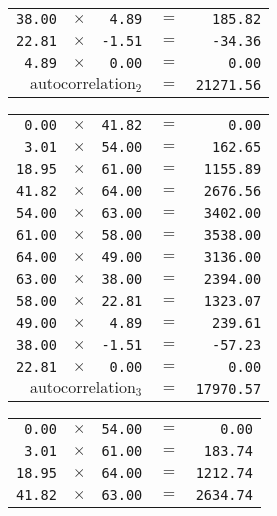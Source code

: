{\begin{multicols}{2}
\begin{tabular}{rrrrr}
  \texttt{38.00} & $\times$ & \texttt{4.89} & $=$ & \texttt{185.82} \\
  \texttt{22.81} & $\times$ & \texttt{-1.51} & $=$ & \texttt{-34.36} \\
  \texttt{4.89} & $\times$ & \texttt{0.00} & $=$ & \texttt{0.00} \\
  \hline
  \multicolumn{3}{r}{$\text{autocorrelation}_2$} & $=$ & \texttt{21271.56} \\
\end{tabular}
\par
\begin{tabular}{rrrrr}
  \texttt{0.00} & $\times$ & \texttt{41.82} & $=$ & \texttt{0.00} \\
  \texttt{3.01} & $\times$ & \texttt{54.00} & $=$ & \texttt{162.65} \\
  \texttt{18.95} & $\times$ & \texttt{61.00} & $=$ & \texttt{1155.89} \\
  \texttt{41.82} & $\times$ & \texttt{64.00} & $=$ & \texttt{2676.56} \\
  \texttt{54.00} & $\times$ & \texttt{63.00} & $=$ & \texttt{3402.00} \\
  \texttt{61.00} & $\times$ & \texttt{58.00} & $=$ & \texttt{3538.00} \\
  \texttt{64.00} & $\times$ & \texttt{49.00} & $=$ & \texttt{3136.00} \\
  \texttt{63.00} & $\times$ & \texttt{38.00} & $=$ & \texttt{2394.00} \\
  \texttt{58.00} & $\times$ & \texttt{22.81} & $=$ & \texttt{1323.07} \\
  \texttt{49.00} & $\times$ & \texttt{4.89} & $=$ & \texttt{239.61} \\
  \texttt{38.00} & $\times$ & \texttt{-1.51} & $=$ & \texttt{-57.23} \\
  \texttt{22.81} & $\times$ & \texttt{0.00} & $=$ & \texttt{0.00} \\
  \hline
  \multicolumn{3}{r}{$\text{autocorrelation}_3$} & $=$ & \texttt{17970.57} \\
\end{tabular}
\par
\begin{tabular}{rrrrr}
  \texttt{0.00} & $\times$ & \texttt{54.00} & $=$ & \texttt{0.00} \\
  \texttt{3.01} & $\times$ & \texttt{61.00} & $=$ & \texttt{183.74} \\
  \texttt{18.95} & $\times$ & \texttt{64.00} & $=$ & \texttt{1212.74} \\
  \texttt{41.82} & $\times$ & \texttt{63.00} & $=$ & \texttt{2634.74} \\

\end{tabular}
\end{multicols}}
